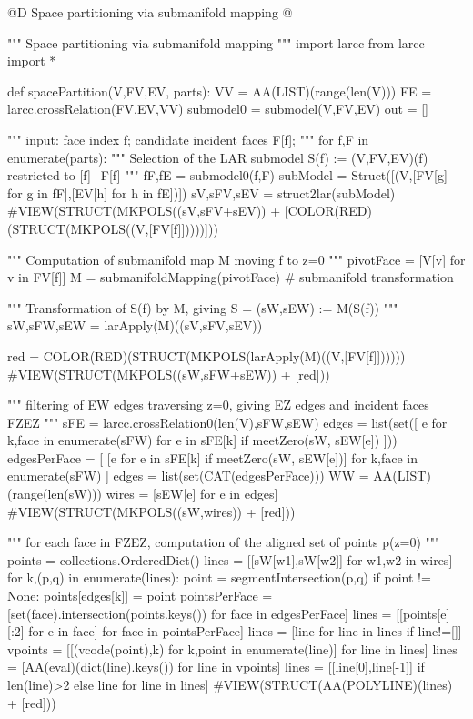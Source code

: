 \documentclass[11pt,oneside]{article}    %
\begin{document}
@D Space partitioning via submanifold mapping
@{""" Space partitioning via submanifold mapping """
import larcc
from larcc import *

def spacePartition(V,FV,EV, parts):
    VV = AA(LIST)(range(len(V)))
    FE = larcc.crossRelation(FV,EV,VV)
    submodel0 = submodel(V,FV,EV)
    out = []
    
    """ input: face index f; candidate incident faces F[f]; """
    for f,F in enumerate(parts):
        """ Selection of the LAR submodel S(f) := (V,FV,EV)(f) restricted to [f]+F[f] """    
        fF,fE = submodel0(f,F)
        subModel = Struct([(V,[FV[g] for g in fF],[EV[h] for h in fE])])
        sV,sFV,sEV = struct2lar(subModel)
        #VIEW(STRUCT(MKPOLS((sV,sFV+sEV)) + [COLOR(RED)(STRUCT(MKPOLS((V,[FV[f]]))))]))
        
        """ Computation of submanifold map M moving f to z=0 """
        pivotFace = [V[v] for v in FV[f]]
        M = submanifoldMapping(pivotFace)  # submanifold transformation
        
        """ Transformation of S(f) by M, giving S = (sW,sEW) := M(S(f)) """
        sW,sFW,sEW = larApply(M)((sV,sFV,sEV))
        
        red = COLOR(RED)(STRUCT(MKPOLS(larApply(M)((V,[FV[f]])))))
        #VIEW(STRUCT(MKPOLS((sW,sFW+sEW)) + [red]))
        
        """ filtering of EW edges traversing z=0, giving EZ edges and incident faces FZEZ """
        sFE = larcc.crossRelation0(len(V),sFW,sEW)    
        edges = list(set([ e for k,face in enumerate(sFW)  for e in sFE[k] 
                    if meetZero(sW, sEW[e]) ]))
        edgesPerFace = [ [e for e in sFE[k] if meetZero(sW, sEW[e])] 
                    for k,face in enumerate(sFW) ]
        edges = list(set(CAT(edgesPerFace)))
        WW = AA(LIST)(range(len(sW)))
        wires = [sEW[e] for e in edges]
        #VIEW(STRUCT(MKPOLS((sW,wires)) + [red]))
        
        """ for each face in FZEZ, computation of the aligned set of points p(z=0) """
        points = collections.OrderedDict()
        lines = [[sW[w1],sW[w2]] for w1,w2 in wires]
        for k,(p,q) in enumerate(lines): 
            point = segmentIntersection(p,q)
            if point != None: points[edges[k]] = point
        pointsPerFace = [set(face).intersection(points.keys()) for face in edgesPerFace]
        lines = [[points[e][:2] for e in face] for face in pointsPerFace]
        lines = [line for line in lines if line!=[]]
        vpoints = [[(vcode(point),k) for k,point in enumerate(line)] for line in lines]
        lines = [AA(eval)(dict(line).keys()) for line in vpoints]
        lines = [[line[0],line[-1]]  if len(line)>2 else line for line in lines]
        #VIEW(STRUCT(AA(POLYLINE)(lines) + [red]))
                
}
\end{document}
